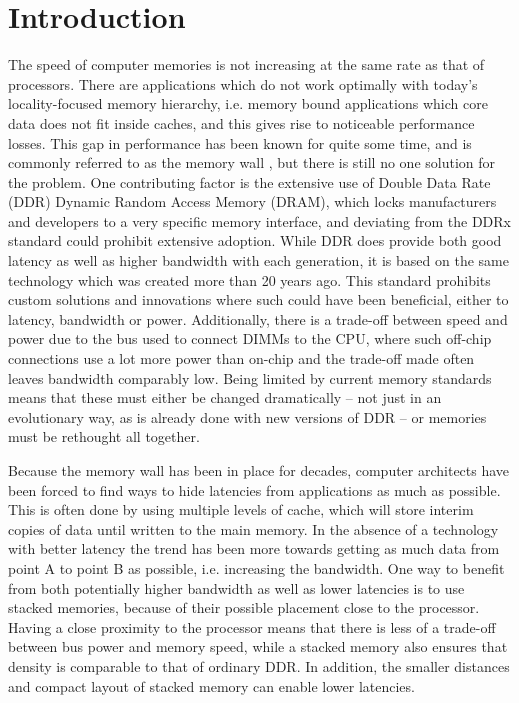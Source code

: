 \chapter{Introduction} \label{intro}
The speed of computer memories is not increasing at the same rate as that of processors. There are applications which do not work optimally with today's locality-focused memory hierarchy, i.e. memory bound applications which core data does not fit inside caches, and this gives rise to noticeable performance losses. This gap in performance has been known for quite some time, and is commonly referred to as the memory wall \cite{wulf1995hitting}, but there is still no one solution for the problem. One contributing factor is the extensive use of Double Data Rate (DDR) \cite{standard2008double} Dynamic Random Access Memory (DRAM), which locks manufacturers and developers to a very specific memory interface, and deviating from the DDRx standard could prohibit extensive adoption. While DDR does provide both good latency as well as higher bandwidth with each generation, it is based on the same technology which was created more than 20 years ago. This standard prohibits custom solutions and innovations where such could have been beneficial, either to latency, bandwidth or power. Additionally, there is a trade-off between speed and power due to the bus used to connect DIMMs to the CPU, where such off-chip connections use a lot more power than on-chip and the trade-off made often leaves bandwidth comparably low. Being limited by current memory standards means that these must either be changed dramatically -- not just in an evolutionary way, as is already done with new versions of DDR -- or memories must be rethought all together.
\bigskip

Because the memory wall has been in place for decades, computer architects have been forced to find ways to hide latencies from applications as much as possible. This is often done by using multiple levels of cache, which will store interim copies of data until written to the main memory. In the absence of a technology with better latency the trend has been more towards getting as much data from point A to point B as possible, i.e. increasing the bandwidth. One way to benefit from both potentially higher bandwidth as well as lower latencies is to use stacked memories, because of their possible placement close to the processor. Having a close proximity to the processor means that there is less of a trade-off between bus power and memory speed, while a stacked memory also ensures that density is comparable to that of ordinary DDR. In addition, the smaller distances and compact layout of stacked memory can enable lower latencies.
\bigskip

